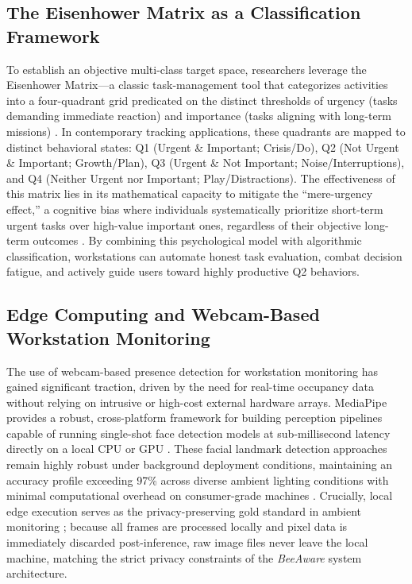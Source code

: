 \documentclass[conference]{IEEEtran}
\begin{document}
\subsection{The Eisenhower Matrix as a Classification Framework}
To establish an objective multi-class target space, researchers leverage the Eisenhower Matrix—a classic task-management tool that categorizes activities into a four-quadrant grid predicated on the distinct thresholds of urgency (tasks demanding immediate reaction) and importance (tasks aligning with long-term missions) \cite{Covey1989}. In contemporary tracking applications, these quadrants are mapped to distinct behavioral states: Q1 (Urgent \& Important; Crisis/Do), Q2 (Not Urgent \& Important; Growth/Plan), Q3 (Urgent \& Not Important; Noise/Interruptions), and Q4 (Neither Urgent nor Important; Play/Distractions). The effectiveness of this matrix lies in its mathematical capacity to mitigate the ``mere-urgency effect,'' a cognitive bias where individuals systematically prioritize short-term urgent tasks over high-value important ones, regardless of their objective long-term outcomes \cite{Zhu2018}. By combining this psychological model with algorithmic classification, workstations can automate honest task evaluation, combat decision fatigue, and actively guide users toward highly productive Q2 behaviors.

\subsection{Edge Computing and Webcam-Based Workstation Monitoring}
The use of webcam-based presence detection for workstation monitoring has gained significant traction, driven by the need for real-time occupancy data without relying on intrusive or high-cost external hardware arrays. MediaPipe provides a robust, cross-platform framework for building perception pipelines capable of running single-shot face detection models at sub-millisecond latency directly on a local CPU or GPU \cite{Lugaresi2019, Bazarevsky2019}. These facial landmark detection approaches remain highly robust under background deployment conditions, maintaining an accuracy profile exceeding 97\% across diverse ambient lighting conditions with minimal computational overhead on consumer-grade machines \cite{Bazarevsky2019, King2009}. Crucially, local edge execution serves as the privacy-preserving gold standard in ambient monitoring \cite{Salice2024}; because all frames are processed locally and pixel data is immediately discarded post-inference, raw image files never leave the local machine, matching the strict privacy constraints of the \emph{BeeAware} system architecture.
\end{document}
